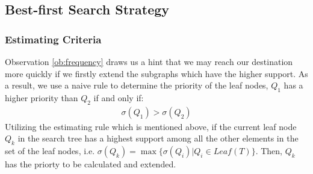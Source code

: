 \subsection{Best-first Search Strategy}
\subsubsection{Estimating Criteria}\label{subsubsec:estimating}
Observation \ref{ob:frequency} draws us a hint that we may reach our destination more quickly if we firstly extend the subgraphs which have the higher support. As a result, we use a naive rule to determine the priority of the leaf nodes, $Q_1$ has a higher priority than $Q_2$ if and only if:
	\begin{align*}\sigma(Q_1)>\sigma(Q_2)\end{align*}
Utilizing the estimating rule which is mentioned above, if the current leaf node $Q_k$ in the search tree has a highest support among all the other elements in the set of the leaf nodes, i.e. $\sigma(Q_k)=\max\{\sigma(Q_i)|Q_i\in Leaf(T)\}$. Then, $Q_k$ has the priorty to be calculated and extended.


